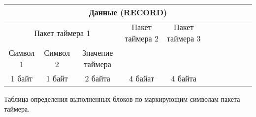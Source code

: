 \footnotesize
\begin{center}
	\begin{tabularx}{\textwidth}{|*5{c|}*6{X|}}
		\hline
		\multicolumn{11}{|c|}{Данные (RECORD)}                                                       \\ \hline
		\multicolumn{3}{|c|}{Пакет таймера 1}  & Пакет таймера 2 & Пакет таймера 3 &  &  &  &  &  &  \\ \cline{1-3}
		Символ 1 & Символ 2 & Значение таймера &                 &                 &  &  &  &  &  &  \\ \hline
		 1 байт  &  1 байт  &     2 байта      &     4 байат     &     4 байта     &  &  &  &  &  &  \\ \hline
	\end{tabularx}  
\end{center}
\normalsize
Таблица определения выполненных блоков по маркирующим символам пакета таймера.
\small
